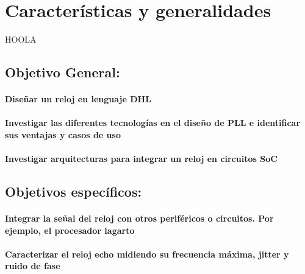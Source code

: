 \documentclass[runningheads,a4paper]{llncs}
\begin{document}


\section{Características y generalidades}
HOOLA


\subsection{Objetivo General:}
\paragraph{Diseñar un reloj en lenguaje DHL}
\paragraph{Investigar las diferentes tecnologías en el diseño de PLL e identificar sus ventajas y casos de uso}
\paragraph{Investigar arquitecturas para integrar un reloj en circuitos SoC}

\subsection{Objetivos específicos:}
\paragraph{Integrar la señal del reloj con otros periféricos o circuitos. Por ejemplo, el procesador lagarto}
\paragraph{Caracterizar el reloj echo midiendo su frecuencia máxima, jitter y ruido de fase}
\end{document}

